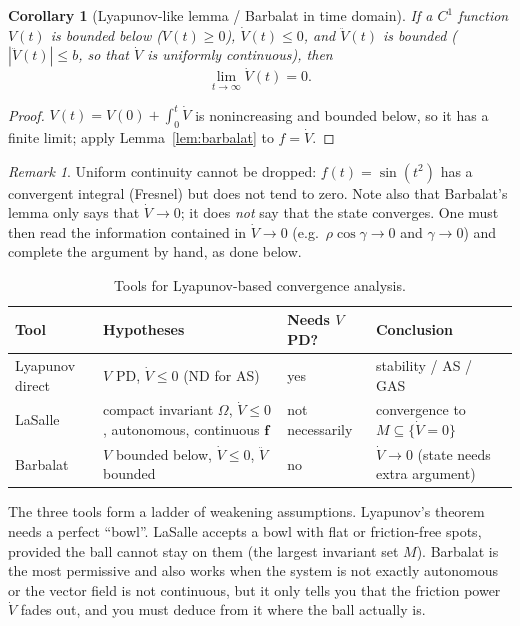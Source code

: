 \documentclass[11pt,a4paper]{article}
\theoremstyle{plain}
\newtheorem{corollary}[theorem]{Corollary}
\theoremstyle{definition}
\theoremstyle{remark}
\newtheorem{remark}[theorem]{Remark}
\begin{document}
\begin{corollary}[Lyapunov-like lemma / Barbalat in time domain]\label{cor:lyaplike}
If a $C^1$ function $V(t)$ is bounded below ($V(t)\ge0$), $\dot V(t)\le0$, and $\ddot V(t)$ is bounded ($|\ddot V(t)|\le b$, so that $\dot V$ is uniformly continuous), then
\[
\lim_{t\to\infty}\dot V(t)=0 .
\]
\end{corollary}

\begin{proof}
$V(t)=V(0)+\int_0^t\dot V$ is nonincreasing and bounded below, so it has a finite limit; apply Lemma~\ref{lem:barbalat} to $f=\dot V$.
\end{proof}

\begin{remark}
Uniform continuity cannot be dropped: $f(t)=\sin(t^2)$ has a convergent integral (Fresnel) but does not tend to zero. Note also that Barbalat's lemma only says that $\dot V\to0$; it does \emph{not} say that the state converges. One must then read the information contained in $\dot V\to0$ (e.g.\ $\rho\cos\gamma\to0$ and $\gamma\to0$) and complete the argument by hand, as done below.
\end{remark}

\begin{table}[ht]
\centering
\renewcommand{\arraystretch}{1.3}
\begin{tabular}{@{}>{\raggedright\arraybackslash}p{2.6cm}>{\raggedright\arraybackslash}p{4.3cm}>{\raggedright\arraybackslash}p{3.0cm}>{\raggedright\arraybackslash}p{4.3cm}@{}}
\toprule
\textbf{Tool} & \textbf{Hypotheses} & \textbf{Needs $V$ PD?} & \textbf{Conclusion}\\
\midrule
Lyapunov direct & $V$ PD, $\dot V\le0$ (ND for AS) & yes & stability / AS / GAS\\
LaSalle & compact invariant $\Omega$, $\dot V\le0$, autonomous, continuous $\bm f$ & not necessarily & convergence to $M\subseteq\{\dot V=0\}$\\
Barbalat & $V$ bounded below, $\dot V\le0$, $\ddot V$ bounded & no & $\dot V\to0$ (state needs extra argument)\\
\bottomrule
\end{tabular}
\caption{Tools for Lyapunov-based convergence analysis.}
\end{table}

\begin{intuition}
The three tools form a ladder of weakening assumptions. Lyapunov's theorem needs a perfect ``bowl''. LaSalle accepts a bowl with flat or friction-free spots, provided the ball cannot stay on them (the largest invariant set $M$). Barbalat is the most permissive and also works when the system is not exactly autonomous or the vector field is not continuous, but it only tells you that the friction power $\dot V$ fades out, and you must deduce from it where the ball actually is.
\end{intuition}
\end{document}
